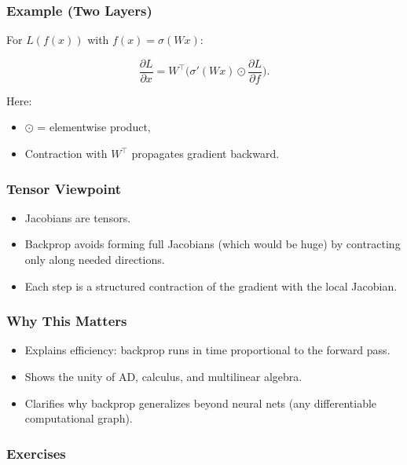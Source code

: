 \documentclass[
  letterpaper,
  DIV=11,
  numbers=noendperiod]{scrreprt}
\providecommand{\tightlist}{%
  \setlength{\itemsep}{0pt}\setlength{\parskip}{0pt}}
\begin{document}
\subsubsection{Example (Two Layers)}\label{example-two-layers}

For \(L(f(x))\) with \(f(x) = \sigma(Wx)\):

\[
\frac{\partial L}{\partial x} = W^\top \big( \sigma'(Wx) \odot \frac{\partial L}{\partial f} \big).
\]

Here:

\begin{itemize}
\tightlist
\item
  \(\odot\) = elementwise product,
\item
  Contraction with \(W^\top\) propagates gradient backward.
\end{itemize}

\subsubsection{Tensor Viewpoint}\label{tensor-viewpoint}

\begin{itemize}
\tightlist
\item
  Jacobians are tensors.
\item
  Backprop avoids forming full Jacobians (which would be huge) by
  contracting only along needed directions.
\item
  Each step is a structured contraction of the gradient with the local
  Jacobian.
\end{itemize}

\subsubsection{Why This Matters}\label{why-this-matters-43}

\begin{itemize}
\tightlist
\item
  Explains efficiency: backprop runs in time proportional to the forward
  pass.
\item
  Shows the unity of AD, calculus, and multilinear algebra.
\item
  Clarifies why backprop generalizes beyond neural nets (any
  differentiable computational graph).
\end{itemize}

\subsubsection{Exercises}\label{exercises-57}
\end{document}
